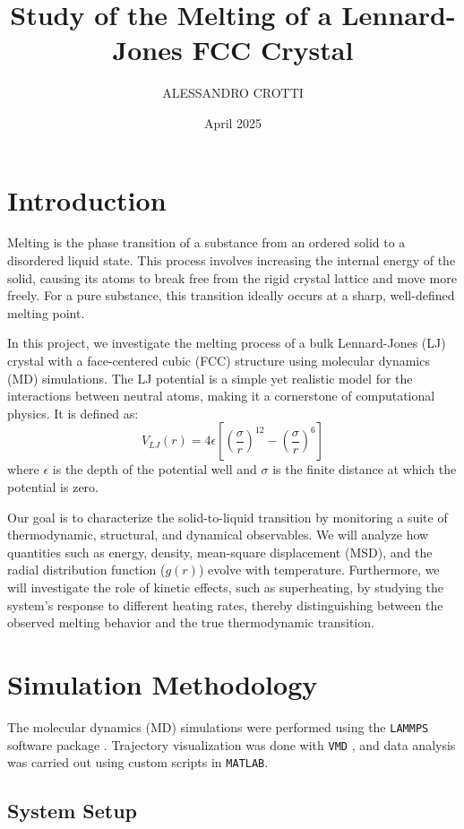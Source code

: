 \documentclass{article}
\title{Study of the Melting of a Lennard-Jones FCC Crystal}
\author{ALESSANDRO CROTTI}
\date{April 2025}
\begin{document}
\maketitle

\section{Introduction}

Melting is the phase transition of a substance from an ordered solid to a disordered liquid state. This process involves increasing the internal energy of the solid, causing its atoms to break free from the rigid crystal lattice and move more freely. For a pure substance, this transition ideally occurs at a sharp, well-defined melting point.

In this project, we investigate the melting process of a bulk Lennard-Jones (LJ) crystal with a face-centered cubic (FCC) structure using molecular dynamics (MD) simulations. The LJ potential is a simple yet realistic model for the interactions between neutral atoms, making it a cornerstone of computational physics. It is defined as:
$$V_{LJ}(r) = 4\epsilon\left[\left(\frac{\sigma}{r}\right)^{12} - \left(\frac{\sigma}{r}\right)^6\right]$$
where $\epsilon$ is the depth of the potential well and $\sigma$ is the finite distance at which the potential is zero.

Our goal is to characterize the solid-to-liquid transition by monitoring a suite of thermodynamic, structural, and dynamical observables. We will analyze how quantities such as energy, density, mean-square displacement (MSD), and the radial distribution function ($g(r)$) evolve with temperature. Furthermore, we will investigate the role of kinetic effects, such as superheating, by studying the system's response to different heating rates, thereby distinguishing between the observed melting behavior and the true thermodynamic transition.

\section{Simulation Methodology}

The molecular dynamics (MD) simulations were performed using the \verb|LAMMPS| software package \cite{LAMMPS}. Trajectory visualization was done with \verb|VMD| \cite{VMD}, and data analysis was carried out using custom scripts in \verb|MATLAB|.

\subsection{System Setup}
\end{document}

